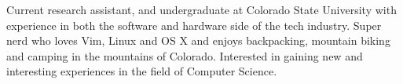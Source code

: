 

\begin{cvparagraph}

Current research assistant, and undergraduate at Colorado State University with experience
in both the software and hardware side of the tech industry.
Super nerd who loves Vim, Linux and OS X and enjoys backpacking, mountain biking and
camping in the mountains of Colorado. Interested in gaining new and interesting experiences
in the field of Computer Science.
\end{cvparagraph}
